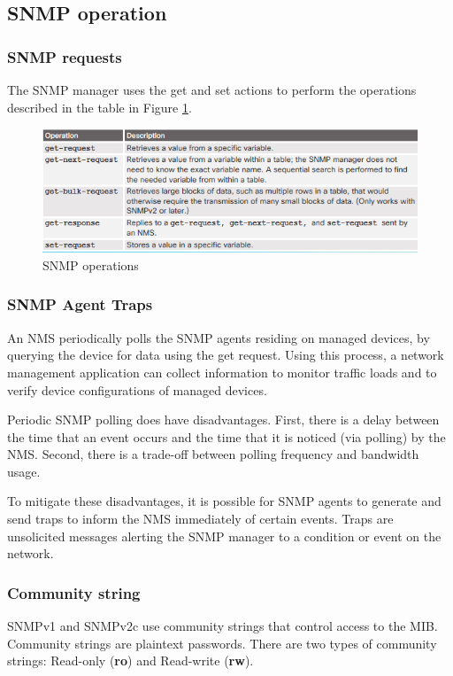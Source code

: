 \subsection{SNMP operation}
\subsubsection{SNMP requests}
The SNMP manager uses the get and set actions to perform the operations described in the table in Figure \ref{SNMPoperation}.
	\begin{figure}[hbtp]
	\caption{SNMP operations}\label{SNMPoperation}
	\centering
	\includegraphics[scale=1]{pictures/SNMPoperation.PNG}
	\end{figure}
\subsubsection{SNMP Agent Traps}
An NMS periodically polls the SNMP agents residing on managed devices, by querying the device for data using the get request. Using this process, a network management application can collect information to monitor traffic loads and to verify device configurations of managed devices.\par 
Periodic SNMP polling does have disadvantages. First, there is a delay between the time that an event occurs and the time that it is noticed (via polling) by the NMS. Second, there is a trade-off between polling frequency and bandwidth usage.\par 
To mitigate these disadvantages, it is possible for SNMP agents to generate and send traps to inform the NMS immediately of certain events. Traps are unsolicited messages alerting the SNMP manager to a condition or event on the network. 
\subsubsection{Community string}
SNMPv1 and SNMPv2c use community strings that control access to the MIB. Community strings are plaintext passwords. There are two types of community strings: Read-only (\textbf{ro}) and Read-write (\textbf{rw}).
